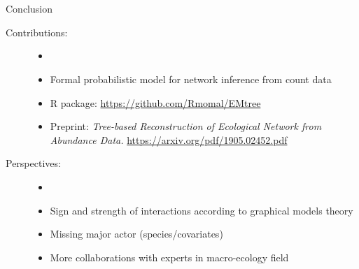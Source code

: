 \documentclass[11pt]{beamer}
\begin{document}
\section{}
\begin{frame}{Conclusion}
\begin{description}
\item[Contributions:] 
\begin{itemize}
\item[]  
	\item Formal probabilistic model for network inference from count data
	\item R package: \footnotesize{\url{https://github.com/Rmomal/EMtree}}
	\item \normalsize{Preprint:} \footnotesize{\textit{Tree-based Reconstruction of Ecological Network from Abundance Data.}} \footnotesize{\url{https://arxiv.org/pdf/1905.02452.pdf}}
	
	
\end{itemize}
\bigskip 
\item[Perspectives:]

\begin{itemize}
\item[]  
	\item Sign and strength of interactions according to graphical models theory
	\item Missing major actor (species/covariates)	
	\item More collaborations with experts in macro-ecology field
\end{itemize}
\end{description}
\end{frame}
\end{document}
